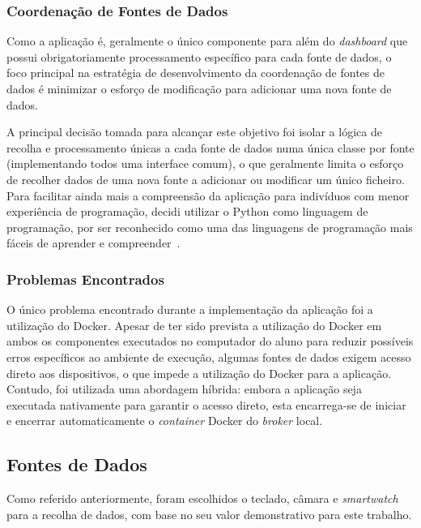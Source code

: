 \subsubsection{Coordenação de Fontes de Dados}

Como a aplicação é, geralmente o único componente para além do \textit{dashboard} que possui obrigatoriamente processamento específico para cada fonte de dados, o foco principal na estratégia de desenvolvimento da coordenação de fontes de dados é minimizar o esforço de modificação para adicionar uma nova fonte de dados.

A principal decisão tomada para alcançar este objetivo foi isolar a lógica de recolha e processamento únicas a cada fonte de dados numa única classe por fonte (implementando todos uma interface comum), o que geralmente limita o esforço de recolher dados de uma nova fonte a adicionar ou modificar um único ficheiro.
Para facilitar ainda mais a compreensão da aplicação para indivíduos com menor experiência de programação, decidi utilizar o Python como linguagem de programação, por ser reconhecido como uma das linguagens de programação mais fáceis de aprender e compreender~\cite{John2025}.

\subsubsection{Problemas Encontrados}

O único problema encontrado durante a implementação da aplicação foi a utilização do Docker.
Apesar de ter sido prevista a utilização do Docker em ambos os componentes executados no computador do aluno para reduzir possíveis erros específicos ao ambiente de execução, algumas fontes de dados exigem acesso direto aos dispositivos, o que impede a utilização do Docker para a aplicação.
Contudo, foi utilizada uma abordagem híbrida: embora a aplicação seja executada nativamente para garantir o acesso direto, esta encarrega-se de iniciar e encerrar automaticamente o \textit{container} Docker do \textit{broker} local.




\subsection{Fontes de Dados}

Como referido anteriormente, foram escolhidos o teclado, câmara e \textit{smartwatch} para a recolha de dados, com base no seu valor demonstrativo para este trabalho.

